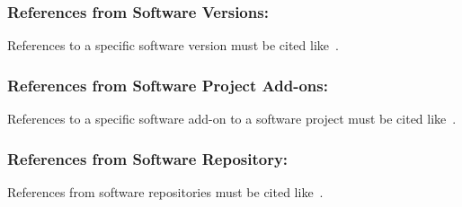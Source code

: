 \documentclass{isprs} %
\begin{document}
\subsubsection{References from Software Versions:}
References to a specific software version must be cited like~\cite{grass2015}.

\subsubsection{References from Software Project Add-ons:}
References to a specific software add-on to a software project must be cited like~\cite{lennert2017}.

\subsubsection{References from Software Repository:}
References from software repositories must be cited like~\cite{gago2016}. 

{
	\begin{spacing}{1.17}
		\normalsize
	\end{spacing}
}
\end{document}
